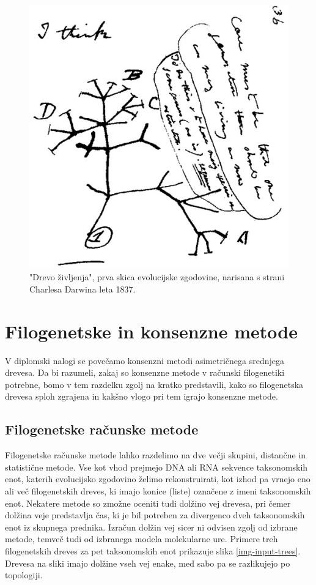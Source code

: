 \documentclass[a4paper, 12pt]{book}
\begin{document}
\begin{figure}
	\begin{center}
		\includegraphics[scale=0.5]{gfx/darwin_tree.jpg}
	\end{center}
	\caption{"Drevo življenja", prva skica evolucijske zgodovine, narisana s strani Charlesa Darwina leta 1837\cite{cd}.}
	\label{img-darwin-tree}
\end{figure}


\chapter{Filogenetske in konsenzne metode}

V diplomski nalogi se povečamo konsenzni metodi asimetričnega srednjega drevesa. Da bi razumeli, zakaj so konsenzne metode v računski filogenetiki potrebne, bomo v tem razdelku zgolj na kratko predstavili, kako so filogenetska drevesa sploh zgrajena in kakšno vlogo pri tem igrajo konsenzne metode. 

\section{Filogenetske računske metode}

Filogenetske računske metode lahko razdelimo na dve večji skupini, distančne in statistične metode. Vse kot vhod prejmejo DNA ali RNA sekvence taksonomskih enot, katerih evolucijsko zgodovino želimo rekonstruirati, kot izhod pa vrnejo eno ali več filogenetskih dreves, ki imajo konice (liste) označene z imeni taksonomskih enot. Nekatere metode so zmožne oceniti tudi dolžino vej drevesa, pri čemer dolžina veje predstavlja čas, ki je bil potreben za divergenco dveh taksonomskih enot iz skupnega prednika. Izračun dolžin vej sicer ni odvisen zgolj od izbrane metode, temveč tudi od izbranega modela molekularne ure. Primere treh filogenetskih dreves za pet taksonomskih enot prikazuje slika \ref{img-input-trees}. Drevesa na sliki imajo dolžine vseh vej enake, med sabo pa se razlikujejo po topologiji.
\end{document}
